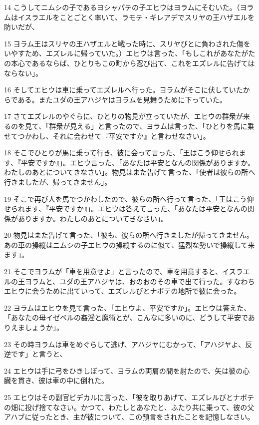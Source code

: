 \par 14 こうしてニムシの子であるヨシャパテの子エヒウはヨラムにそむいた。（ヨラムはイスラエルをことごとく率いて、ラモテ・ギレアデでスリヤの王ハザエルを防いだが、
\par 15 ヨラム王はスリヤの王ハザエルと戦った時に、スリヤびとに負わされた傷をいやすため、エズレルに帰っていた。）エヒウは言った、「もしこれがあなたがたの本心であるならば、ひとりもこの町から忍び出て、これをエズレルに告げてはならない」。
\par 16 そしてエヒウは車に乗ってエズレルへ行った。ヨラムがそこに伏していたからである。またユダの王アハジヤはヨラムを見舞うために下っていた。
\par 17 さてエズレルのやぐらに、ひとりの物見が立っていたが、エヒウの群衆が来るのを見て、「群衆が見える」と言ったので、ヨラムは言った、「ひとりを馬に乗せてつかわし、それに会わせて『平安ですか』と言わせなさい」。
\par 18 そこでひとりが馬に乗って行き、彼に会って言った、「王はこう仰せられます、『平安ですか』」。エヒウ言った、「あなたは平安となんの関係がありますか。わたしのあとについてきなさい」。物見はまた告げて言った、「使者は彼らの所へ行きましたが、帰ってきません」。
\par 19 そこで再び人を馬でつかわしたので、彼らの所へ行って言った、「王はこう仰せられます、『平安ですか』」。エヒウは答えて言った、「あなたは平安となんの関係がありますか。わたしのあとについてきなさい」。
\par 20 物見はまた告げて言った、「彼も、彼らの所へ行きましたが帰ってきません。あの車の操縦はニムシの子エヒウの操縦するのに似て、猛烈な勢いで操縦して来ます」。
\par 21 そこでヨラムが「車を用意せよ」と言ったので、車を用意すると、イスラエルの王ヨラムと、ユダの王アハジヤは、おのおのその車で出て行った。すなわちエヒウに会うために出ていって、エズレルびとナボテの地所で彼に会った。
\par 22 ヨラムはエヒウを見て言った、「エヒウよ、平安ですか」。エヒウは答えた、「あなたの母イゼベルの姦淫と魔術とが、こんなに多いのに、どうして平安でありえましょうか」。
\par 23 その時ヨラムは車をめぐらして逃げ、アハジヤにむかって、「アハジヤよ、反逆です」と言うと、
\par 24 エヒウは手に弓をひきしぼって、ヨラムの両肩の間を射たので、矢は彼の心臓を貫き、彼は車の中に倒れた。
\par 25 エヒウはその副官ビデカルに言った、「彼を取りあげて、エズレルびとナボテの畑に投げ捨てなさい。かつて、わたしとあなたと、ふたり共に乗って、彼の父アハブに従ったとき、主が彼について、この預言をされたことを記憶しなさい。
